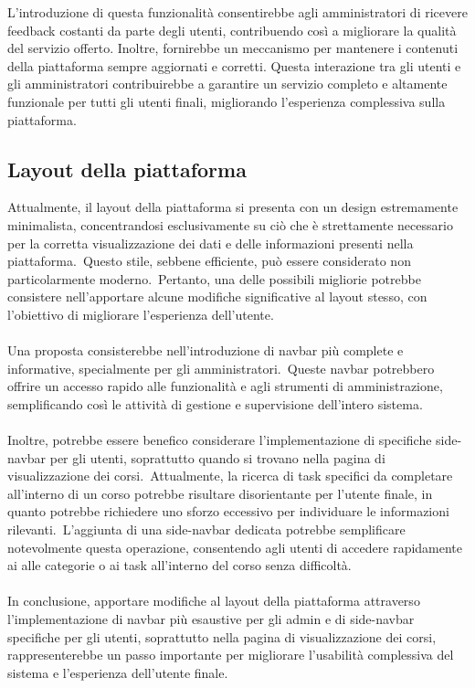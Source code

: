 L'introduzione di questa funzionalità consentirebbe agli amministratori di ricevere feedback costanti da parte degli utenti, contribuendo così a migliorare la qualità del servizio offerto. Inoltre, fornirebbe un meccanismo per mantenere i contenuti della piattaforma sempre aggiornati e corretti. Questa interazione tra gli utenti e gli amministratori contribuirebbe a garantire un servizio completo e altamente funzionale per tutti gli utenti finali, migliorando l'esperienza complessiva sulla piattaforma.
%
\subsection{Layout della piattaforma}\label{sec:cap_sec_subsec}
Attualmente, il layout della piattaforma si presenta con un design estremamente minimalista, 
concentrandosi esclusivamente su ciò che è strettamente necessario per la corretta visualizzazione 
dei dati e delle informazioni presenti nella piattaforma.\ Questo stile, sebbene efficiente, 
può essere considerato non particolarmente moderno.\ Pertanto, una delle possibili migliorie potrebbe 
consistere nell'apportare alcune modifiche significative al layout stesso, con l'obiettivo di migliorare l'esperienza dell'utente.
\\ \\
Una proposta consisterebbe nell'introduzione di navbar più complete e informative, specialmente per gli amministratori.\ 
Queste navbar potrebbero offrire un accesso rapido alle funzionalità e agli strumenti di amministrazione, 
semplificando così le attività di gestione e supervisione dell'intero sistema.
\\ \\
Inoltre, potrebbe essere benefico considerare l'implementazione di specifiche side-navbar per gli utenti, 
soprattutto quando si trovano nella pagina di visualizzazione dei corsi.\ 
Attualmente, la ricerca di task specifici da completare all'interno di un corso potrebbe risultare disorientante per l'utente finale, 
in quanto potrebbe richiedere uno sforzo eccessivo per individuare le informazioni rilevanti.\ 
L'aggiunta di una side-navbar dedicata potrebbe semplificare notevolmente questa operazione, 
consentendo agli utenti di accedere rapidamente ai alle categorie o ai task all'interno del corso senza difficoltà.
\\ \\
In conclusione, apportare modifiche al layout della piattaforma attraverso l'implementazione di navbar 
più esaustive per gli admin e di side-navbar specifiche per gli utenti, soprattutto nella pagina di visualizzazione dei corsi, 
rappresenterebbe un passo importante per migliorare l'usabilità complessiva del sistema e l'esperienza dell'utente finale.
%
